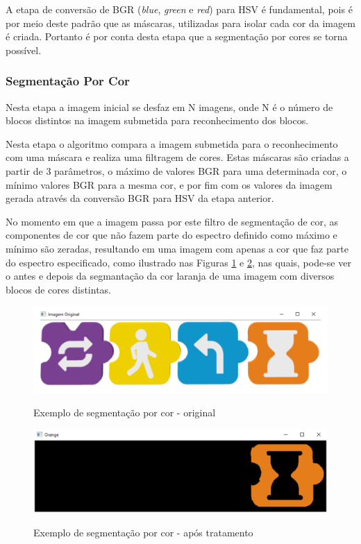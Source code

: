     A etapa de conversão de BGR (\textit{blue}, \textit{green} e \textit{red}) para HSV é fundamental, pois é por meio deste padrão que as máscaras, utilizadas para isolar cada cor da imagem é criada. Portanto é por conta desta etapa que a segmentação por cores se torna possível.

    
    \subsubsection{Segmentação Por Cor}
    Nesta etapa a imagem inicial se desfaz em N imagens, onde N  é o número de blocos distintos na imagem submetida para reconhecimento dos blocos.
    
    Nesta etapa o algoritmo compara a imagem submetida para o reconhecimento com uma máscara e realiza uma filtragem de cores. Estas máscaras são criadas a partir de 3 parâmetros, o máximo de valores BGR para uma determinada cor, o mínimo valores BGR para a mesma cor, e por fim com os valores da imagem gerada através da conversão BGR para HSV da etapa anterior. 
    
    No momento em que a imagem passa por este filtro de segmentação de cor, as componentes de cor que não fazem parte do espectro definido como máximo e mínimo são zeradas, resultando em uma imagem com apenas a cor que faz parte do espectro especificado, como ilustrado nas Figuras \ref{figura:ex1_original} e \ref{figura:ex1_tratado}, nas quais, pode-se ver o antes e depois da segmantação da cor laranja de uma imagem com diversos blocos de cores distintas.
    
    \begin{figure}[H]
        \caption{Exemplo de segmentação por cor - original}
        \centering
        \includegraphics[width=\linewidth]{Imagens/Cap4/ex1_original.PNG}
        \label{figura:ex1_original}
    \end{figure}
    
    
    \begin{figure}[H]
        \caption{Exemplo de segmentação por cor - após tratamento}
        \centering
        \includegraphics[width=\linewidth]{Imagens/Cap4/ex1_tratado.PNG}
        \label{figura:ex1_tratado}
    \end{figure}
    
